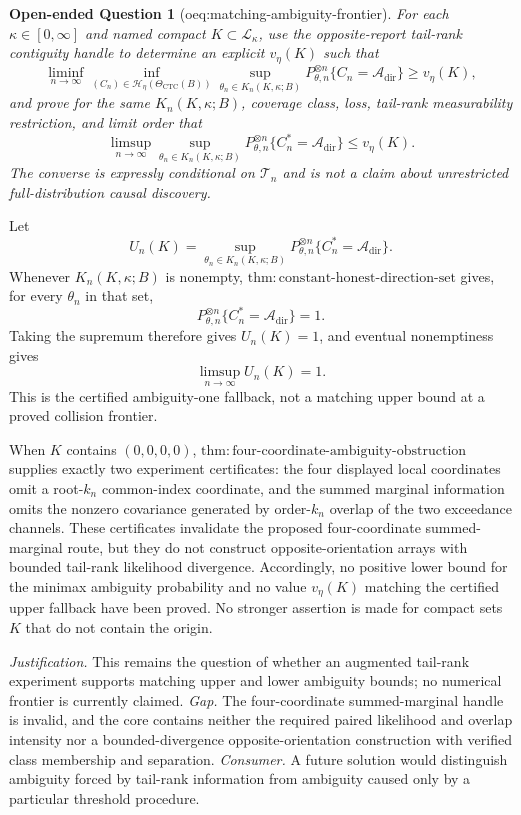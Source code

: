 \documentclass{article}
\newtheorem{openendedquestion}{Open-ended Question}
\begin{document}
\begin{openendedquestion}[oeq:matching-ambiguity-frontier]\label{oeq:matching-ambiguity-frontier}
For each \(\kappa\in[0,\infty]\) and named compact \(K\subset\mathcal L_\kappa\), use the opposite-report tail-rank contiguity handle to determine an explicit \(v_\eta(K)\) such that \[\liminf_{n\to\infty}\inf_{(C_n)\in\mathcal H_\eta(\Theta_{\mathrm{CTC}}(B))}\sup_{\theta_n\in K_n(K,\kappa;B)}P_{\theta,n}^{\otimes n}\{C_n=\mathcal A_{\mathrm{dir}}\}\geq v_\eta(K),\] and prove for the same \(K_n(K,\kappa;B)\), coverage class, loss, tail-rank measurability restriction, and limit order that \[\limsup_{n\to\infty}\sup_{\theta_n\in K_n(K,\kappa;B)}P_{\theta,n}^{\otimes n}\{C_n^*=\mathcal A_{\mathrm{dir}}\}\leq v_\eta(K).\] The converse is expressly conditional on \(\mathcal T_n\) and is not a claim about unrestricted full-distribution causal discovery.
\end{openendedquestion}
Let
\[
U_n(K)=\sup_{\theta_n\in K_n(K,\kappa;B)}
P_{\theta,n}^{\otimes n}\{C_n^*=\mathcal A_{\mathrm{dir}}\}.
\]
Whenever \(K_n(K,\kappa;B)\) is nonempty, \(\mathrm{thm{:}constant\text{-}honest\text{-}direction\text{-}set}\) gives, for every \(\theta_n\) in that set,
\[
P_{\theta,n}^{\otimes n}\{C_n^*=\mathcal A_{\mathrm{dir}}\}=1.
\]
Taking the supremum therefore gives \(U_n(K)=1\), and eventual nonemptiness gives
\[
\limsup_{n\to\infty}U_n(K)=1.
\]
This is the certified ambiguity-one fallback, not a matching upper bound at a proved collision frontier.

When \(K\) contains \((0,0,0,0)\), \(\mathrm{thm{:}four\text{-}coordinate\text{-}ambiguity\text{-}obstruction}\) supplies exactly two experiment certificates: the four displayed local coordinates omit a root-\(k_n\) common-index coordinate, and the summed marginal information omits the nonzero covariance generated by order-\(k_n\) overlap of the two exceedance channels.  These certificates invalidate the proposed four-coordinate summed-marginal route, but they do not construct opposite-orientation arrays with bounded tail-rank likelihood divergence.  Accordingly, no positive lower bound for the minimax ambiguity probability and no value \(v_\eta(K)\) matching the certified upper fallback have been proved.  No stronger assertion is made for compact sets \(K\) that do not contain the origin.
\par\smallskip\noindent \textit{Justification.} This remains the question of whether an augmented tail-rank experiment supports matching upper and lower ambiguity bounds; no numerical frontier is currently claimed. \textit{Gap.} The four-coordinate summed-marginal handle is invalid, and the core contains neither the required paired likelihood and overlap intensity nor a bounded-divergence opposite-orientation construction with verified class membership and separation. \textit{Consumer.} A future solution would distinguish ambiguity forced by tail-rank information from ambiguity caused only by a particular threshold procedure.
\end{document}
